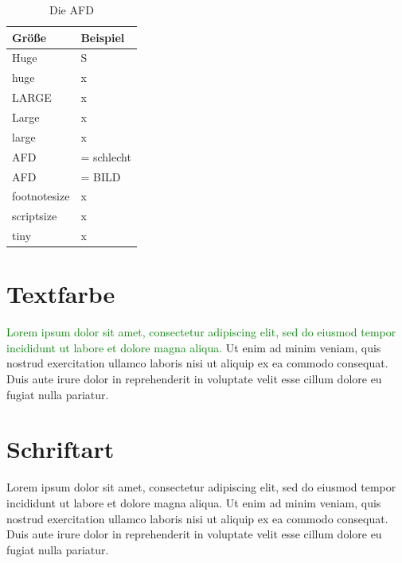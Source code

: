 \documentclass[50pt, a4paper]{article}
\begin{document}
\begin{table}[h] 
\centering
\begin{tabular}{l | l}
\bf{Gr\"o\ss e} & \bf{Beispiel} \\
\hline 
Huge & S\\
\hline
huge & x\\
\hline
LARGE & x\\
\hline
Large & x\\
\hline 
large & x\\
\hline
AFD & = schlecht\\
\hline
AFD & = BILD\\
\hline
footnotesize & x\\
\hline
scriptsize & x\\
\hline
tiny & x\\
\end{tabular}
\caption{\label{tab4}Die AFD }
\end{table}

\section{Textfarbe}


\textcolor{green}{Lorem ipsum dolor sit amet, consectetur adipiscing elit, sed do eiusmod tempor incididunt ut labore et dolore magna aliqua.}
\textcolor{pinguin}{Ut enim ad minim veniam, quis nostrud exercitation ullamco laboris nisi ut aliquip ex ea commodo consequat. Duis aute irure dolor in reprehenderit in voluptate velit esse cillum dolore eu fugiat nulla pariatur.}

\section{Schriftart}



\textcolor{leopard}{Lorem ipsum dolor sit amet, consectetur adipiscing elit, sed do eiusmod tempor incididunt ut labore et dolore magna aliqua.}  Ut enim ad minim veniam, quis nostrud exercitation ullamco laboris nisi ut aliquip ex ea commodo consequat. Duis aute irure dolor in reprehenderit in voluptate velit esse cillum dolore eu fugiat nulla pariatur.
\end{document}

